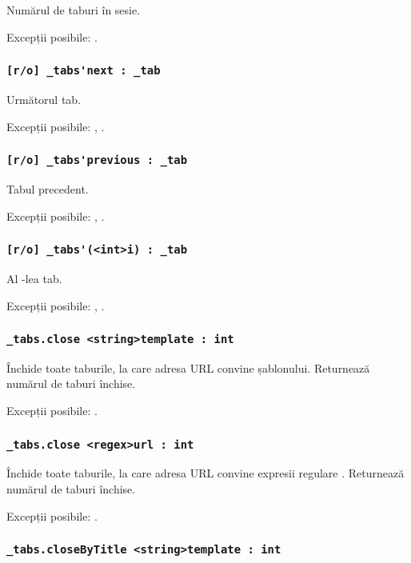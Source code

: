 Numărul de taburi în sesie.

Excepții posibile: .

\subsubsection{\lstinline|[r/o] _tabs'next : _tab|}

Următorul tab.

Excepții posibile: , .

\subsubsection{\lstinline|[r/o] _tabs'previous : _tab|}

Tabul precedent.

Excepții posibile: , .

\subsubsection{\lstinline|[r/o] _tabs'(<int>i) : _tab|}

Al -lea tab.

Excepții posibile: , .

\subsubsection{\lstinline|_tabs.close <string>template : int|}

Închide toate taburile, la care adresa URL convine șablonului. Returnează numărul de taburi închise.

Excepții posibile: .

\subsubsection{\lstinline|_tabs.close <regex>url : int|}

Închide toate taburile, la care adresa URL convine expresii regulare . Returnează numărul de taburi închise.

Excepții posibile: .

\subsubsection{\lstinline|_tabs.closeByTitle <string>template : int|}

